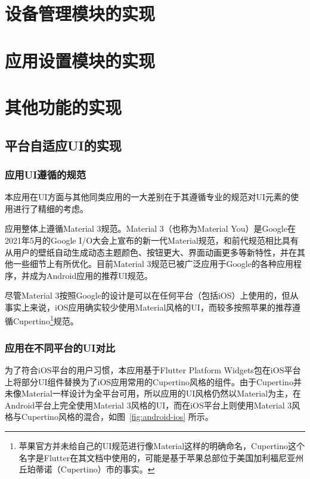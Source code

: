 

\section{设备管理模块的实现}\label{sec:device}



\section{应用设置模块的实现}\label{sec:settings}



\section{其他功能的实现}\label{sec:other}

\subsection{平台自适应UI的实现}\label{subsec:adaptive-ui}

\subsubsection{应用UI遵循的规范}

本应用在UI方面与其他同类应用的一大差别在于其遵循专业的规范对UI元素的使用进行了精细的考虑。

应用整体上遵循Material 3规范\cite{MaterialDesign}。Material 3（也称为Material You）是Google在2021年5月的Google I/O大会上宣布的新一代Material规范，和前代规范相比具有从用户的壁纸自动生成动态主题颜色、按钮更大、界面动画更多等新特性，并在其他一些细节上有所优化。目前Material 3规范已被广泛应用于Google的各种应用程序，并成为Android应用的推荐UI规范。

尽管Material 3按照Google的设计是可以在任何平台（包括iOS）上使用的，但从事实上来说，iOS应用确实较少使用Material风格的UI，而较多按照苹果的推荐遵循Cupertino\footnote{苹果官方并未给自己的UI规范进行像Material这样的明确命名，Cupertino这个名字是Flutter在其文档中使用的，可能是基于苹果总部位于美国加利福尼亚州丘珀蒂诺（Cupertino）市的事实。}规范。

\subsubsection{应用在不同平台的UI对比}

为了符合iOS平台的用户习惯，本应用基于Flutter Platform Widgets包在iOS平台上将部分UI组件替换为了iOS应用常用的Cupertino风格的组件。由于Cupertino并未像Material一样设计为全平台可用，所以应用的UI风格仍然以Material为主，在Android平台上完全使用Material 3风格的UI，而在iOS平台上则使用Material 3风格与Cupertino风格的混合，如图~\ref{fig:android-ios} 所示。

